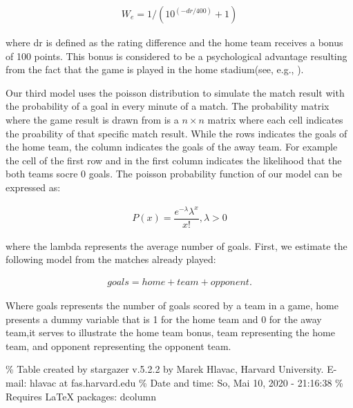 \documentclass[12pt,a4paper]{article}
\begin{document}
\begin{align}
W_e = 1/(10^{(-dr/400)}+1)
\end{align}

where dr is defined as the rating difference and the home team receives
a bonus of 100 points. This bonus is considered to be a psychological
advantage resulting from the fact that the game is played in the home
stadium(see, e.g., \textcite{Pollard2008}).

Our third model uses the poisson distribution to simulate the match
result with the probability of a goal in every minute of a match. The
probability matrix where the game result is drawn from is a
\(n \times n\) matrix where each cell indicates the proability of that
specific match result. While the rows indicates the goals of the home
team, the column indicates the goals of the away team. For example the
cell of the first row and in the first column indicates the likelihood
that the both teams socre \(0\) goals. The poisson probability function
of our model can be expressed as:

\begin{align}
P(x) = \dfrac{e^{-\lambda}\lambda^x}{x!}, \lambda > 0
\end{align}

where the lambda represents the average number of goals. First, we
estimate the following model from the matches already played:

\begin{align}
goals = home + team + opponent . 
\end{align}

Where goals represents the number of goals scored by a team in a game,
home presents a dummy variable that is 1 for the home team and 0 for the
away team,it serves to illustrate the home team bonus, team representing
the home team, and opponent representing the opponent team.

\% Table created by stargazer v.5.2.2 by Marek Hlavac, Harvard
University. E-mail: hlavac at fas.harvard.edu \% Date and time: So, Mai
10, 2020 - 21:16:38 \% Requires LaTeX packages: dcolumn
\end{document}
